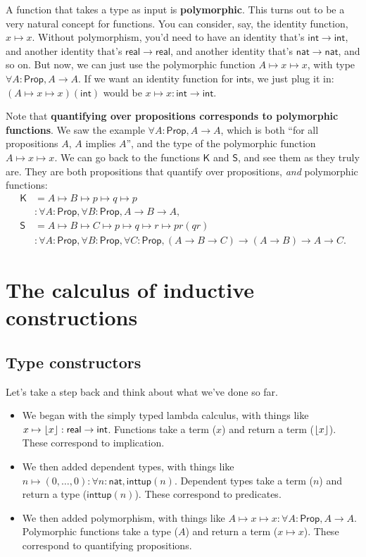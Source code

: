 \documentclass[11pt,paper=letter]{scrartcl}
\renewcommand{\sf}{\mathsf}
\newcommand{\prop}{\mathsf{Prop}}
\begin{document}
A function that takes a type as input is \textbf{polymorphic}. This turns out to be a very natural concept for functions. You can consider, say, the identity function, $x \mapsto x$. Without polymorphism, you'd need to have an identity that's $\sf{int} \to \sf{int}$, and another identity that's $\sf{real} \to \sf{real}$, and another identity that's $\sf{nat} \to \sf{nat}$, and so on. But now, we can just use the polymorphic function $A \mapsto x \mapsto x$, with type $\forall A: \prop, A \to A$. If we want an identity function for $\sf{int}$s, we just plug it in: $(A \mapsto x \mapsto x)(\sf{int})$ would be $x \mapsto x : \sf{int} \to \sf{int}$.

Note that \textbf{quantifying over propositions corresponds to polymorphic functions}. We saw the example $\forall A: \prop, A \to A$, which is both ``for all propositions $A$, $A$ implies $A$'', and the type of the polymorphic function $A \mapsto x \mapsto x$. We can go back to the functions $\sf{K}$ and $\sf{S}$, and see them as they truly are. They are both propositions that quantify over propositions, \emph{and} polymorphic functions:
\begin{align*}
\sf{K} &= A \mapsto B \mapsto p \mapsto q \mapsto p \\
&: \forall A: \prop, \forall B: \prop, A \to B \to A, \\
\sf{S} &= A \mapsto B \mapsto C \mapsto p \mapsto q \mapsto r \mapsto pr(qr) \\
&: \forall A: \prop, \forall B: \prop, \forall C: \prop,
(A \to B \to C) \to (A \to B) \to A \to C.
\end{align*}

\clearpage
\section{The calculus of inductive constructions}

\subsection{Type constructors}

Let's take a step back and think about what we've done so far.

\begin{itemize}
\item We began with the simply typed lambda calculus, with things like $x \mapsto \floor{x} : \sf{real} \to \sf{int}$. Functions take a term ($x$) and return a term ($\left\lfloor x \right\rfloor$). These correspond to implication.

\item We then added dependent types, with things like $n \mapsto (0, \ldots, 0) : \forall n: \sf{nat}, \sf{inttup}(n)$. Dependent types take a term ($n$) and return a type ($\sf{inttup}(n)$). These correspond to predicates.

\item We then added polymorphism, with things like $A \mapsto x \mapsto x : \forall A: \sf{Prop}, A \to A$. Polymorphic functions take a type ($A$) and return a term ($x \mapsto x$). These correspond to quantifying propositions.
\end{itemize}
\end{document}
